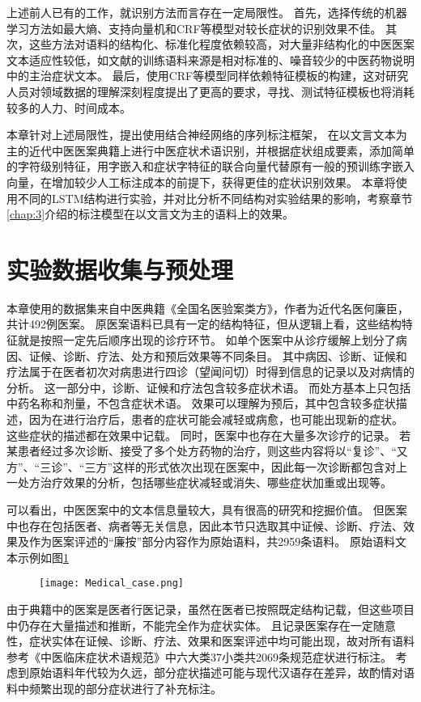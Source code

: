 上述前人已有的工作，就识别方法而言存在一定局限性。
首先，选择传统的机器学习方法如最大熵、支持向量机和CRF等模型对较长症状的识别效果不佳\citep{王世昆2009基于条件随机场的中医命名实体识别}。
其次，这些方法对语料的结构化、标准化程度依赖较高，对大量非结构化的中医医案文本适应性较低，如文献的训练语料来源是相对标准的、噪音较少的中医药物说明中的主治症状文本。
最后，使用CRF等模型同样依赖特征模板的构建，这对研究人员对领域数据的理解深刻程度提出了更高的要求，寻找、测试特征模板也将消耗较多的人力、时间成本。

本章针对上述局限性，提出使用结合神经网络的序列标注框架，
在以文言文本为主的近代中医医案典籍上进行中医症状术语识别，并根据症状组成要素，添加简单的字符级别特征，用字嵌入和症状字特征的联合向量代替原有一般的预训练字嵌入向量，在增加较少人工标注成本的前提下，获得更佳的症状识别效果。
本章将使用不同的LSTM结构进行实验，并对比分析不同结构对实验结果的影响，考察章节\ref{chap:3}介绍的标注模型在以文言文为主的语料上的效果。

\section{实验数据收集与预处理}
本章使用的数据集来自中医典籍《全国名医验案类方》，作者为近代名医何廉臣，共计492例医案。
原医案语料已具有一定的结构特征，但从逻辑上看，这些结构特征就是按照一定先后顺序出现的诊疗环节。
如单个医案中从诊疗缓解上划分了病因、证候、诊断、疗法、处方和预后效果等不同条目。
其中病因、诊断、证候和疗法属于在医者初次对病患进行四诊（望闻问切）时得到信息的记录以及对病情的分析。
这一部分中，诊断、证候和疗法包含较多症状术语。
而处方基本上只包括中药名称和剂量，不包含症状术语。
效果可以理解为预后，其中包含较多症状描述，因为在进行治疗后，患者的症状可能会减轻或病愈，也可能出现新的症状。
这些症状的描述都在效果中记载。
同时，医案中也存在大量多次诊疗的记录。
若某患者经过多次诊断、接受了多个处方药物的治疗，则这些内容将以“复诊”、“又方”、“三诊”、“三方”这样的形式依次出现在医案中，因此每一次诊断都包含对上一处方治疗效果的分析，包括哪些症状减轻或消失、哪些症状加重或出现等。

可以看出，中医医案中的文本信息量较大，具有很高的研究和挖掘价值。
但医案中也存在包括医者、病者等无关信息，因此本节只选取其中证候、诊断、疗法、效果及作为医案评述的“廉按”部分内容作为原始语料，共2959条语料。
原始语料文本示例如图\ref{fig:medical_case}

\begin{figure}[H]
    \centering
    \texttt{[image: Medical\_case.png]}
    \label{fig:medical_case}
\end{figure}
由于典籍中的医案是医者行医记录，虽然在医者已按照既定结构记载，但这些项目中仍存在大量描述和推断，不能完全作为症状实体。
且记录医案存在一定随意性，症状实体在证候、诊断、疗法、效果和医案评述中均可能出现，故对所有语料参考《中医临床症状术语规范》中六大类37小类共2069条规范症状进行标注。
考虑到原始语料年代较为久远，部分症状描述可能与现代汉语存在差异，故酌情对语料中频繁出现的部分症状进行了补充标注。

